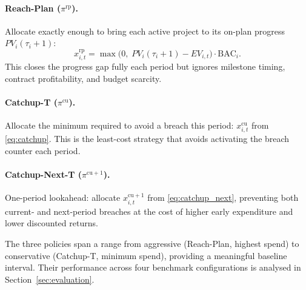 \paragraph{Reach-Plan ($\pi^{\mathrm{rp}}$).}
Allocate exactly enough to bring each active project to its on-plan
progress $PV_i(\tau_i + 1)$:
\begin{equation}
  x^{\mathrm{rp}}_{i,t}
    = \max\!\bigl(0,\; PV_i(\tau_i+1) - EV_{i,t}\bigr) \cdot
      \mathrm{BAC}_i.
  \label{eq:reach_plan}
\end{equation}
This closes the progress gap fully each period but ignores milestone
timing, contract profitability, and budget scarcity.

\paragraph{Catchup-T ($\pi^{\mathrm{cu}}$).}
Allocate the minimum required to avoid a breach this period:
$x^{\mathrm{cu}}_{i,t}$ from \eqref{eq:catchup}.
This is the least-cost strategy that avoids activating the breach
counter each period.

\paragraph{Catchup-Next-T ($\pi^{\mathrm{cu}+1}$).}
One-period lookahead: allocate $x^{\mathrm{cu}+1}_{i,t}$ from
\eqref{eq:catchup_next}, preventing both current- and next-period
breaches at the cost of higher early expenditure and lower discounted
returns.

The three policies span a range from aggressive (Reach-Plan, highest
spend) to conservative (Catchup-T, minimum spend), providing a
meaningful baseline interval. Their performance across four benchmark
configurations is analysed in Section~\ref{sec:evaluation}.